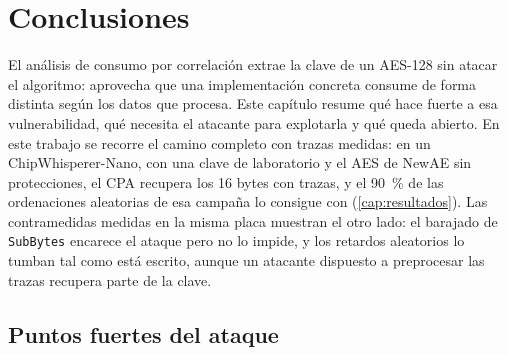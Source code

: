 \chapter{Conclusiones}
\label{cap:conclusiones}

El análisis de consumo por correlación extrae la clave de un AES-128 sin
atacar el algoritmo: aprovecha que una implementación concreta consume de forma
distinta según los datos que procesa. Este capítulo resume qué hace fuerte a
esa vulnerabilidad, qué necesita el atacante para explotarla y qué queda
abierto. En este trabajo se recorre el camino completo con trazas medidas: en
un ChipWhisperer-Nano, con una clave de laboratorio y el AES de NewAE sin
protecciones, el CPA recupera los 16 bytes con \realAttackTraces{} trazas, y el
90~\% de las ordenaciones aleatorias de esa campaña lo consigue con
\realTracesNinety{} (\cref{cap:resultados}). Las contramedidas medidas en la
misma placa muestran el otro lado: el barajado de \texttt{SubBytes} encarece el
ataque pero no lo impide, y los retardos aleatorios lo tumban tal como está
escrito, aunque un atacante dispuesto a preprocesar las
trazas recupera parte de la clave.

\section{Puntos fuertes del ataque}
\label{sec:puntos-fuertes}

